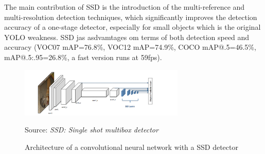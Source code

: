 \documentclass[12pt]{article}
\newcommand{\source}[1]{\caption*{Source: \emph{#1}} }
\begin{document}
The main contribution of SSD is the introduction of the multi-reference and 
multi-resolution detection techniques, which significantly improves the detection 
accuracy of a one-stage detector, especially for small objects which is the original 
YOLO weakness. SSD jas asdvamtages om terms of both detection speed and accuracy 
(VOC07 mAP=76.8\%, VOC12 mAP=74.9\%, COCO mAP@.5=46.5\%, mAP@.5:.95=26.8\%, a fast 
version runs at 59fps).

\begin{figure}[htp]
    \centering
    \includegraphics[width=0.7\textwidth]{images/ssd.png}
    \caption{Architecture of a convolutional neural network with a SSD detector}
    \label{fig:ssd}
    \source{SSD: Single shot multibox detector \cite{liu2016ssd}}
\end{figure}




\newpage
\printbibliography
\end{document}
